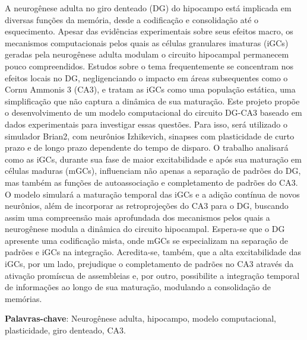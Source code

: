 \begin{resumo}

A neurogênese adulta no giro denteado (DG) do hipocampo está implicada em diversas funções da memória, desde a codificação e
consolidação até o esquecimento. Apesar das evidências experimentais sobre seus efeitos macro, os mecanismos computacionais pelos
quais as células granulares imaturas (iGCs) geradas pela neurogênese adulta modulam o circuito hipocampal permanecem pouco
compreendidos. Estudos sobre o tema frequentemente se concentram nos efeitos locais no DG, negligenciando o impacto em áreas
subsequentes como o Cornu Ammonis 3 (CA3), e tratam as iGCs como uma população estática, uma simplificação que não captura a
dinâmica de sua maturação. Este projeto propõe o desenvolvimento de um modelo computacional do circuito DG-CA3 baseado em dados
experimentais para investigar essas questões. Para isso, será utilizado o simulador Brian2, com neurônios Izhikevich, sinapses com
plasticidade de curto prazo e de longo prazo dependente do tempo de disparo. O trabalho analisará como as iGCs, durante sua fase
de maior excitabilidade e após sua maturação em células maduras (mGCs), influenciam não apenas a separação de padrões do DG, mas
também as funções de autoassociação e completamento de padrões do CA3. O modelo simulará a maturação temporal das iGCs e a adição
contínua de novos neurônios, além de incorporar as retroprojeções do CA3 para o DG, buscando assim uma compreensão mais
aprofundada dos mecanismos pelos quais a neurogênese modula a dinâmica do circuito hipocampal. Espera-se que o DG apresente uma
codificação mista, onde mGCs se especializam na separação de padrões e iGCs na integração. Acredita-se, também, que a alta
excitabilidade das iGCs, por um lado, prejudique o completamento de padrões no CA3 através da ativação promíscua de assembleias e,
por outro, possibilite a integração temporal de informações ao longo de sua maturação, modulando a consolidação de memórias.

\noindent\textbf{Palavras-chave}: Neurogênese adulta, hipocampo, modelo computacional, plasticidade, giro denteado, CA3.
\end{resumo}


